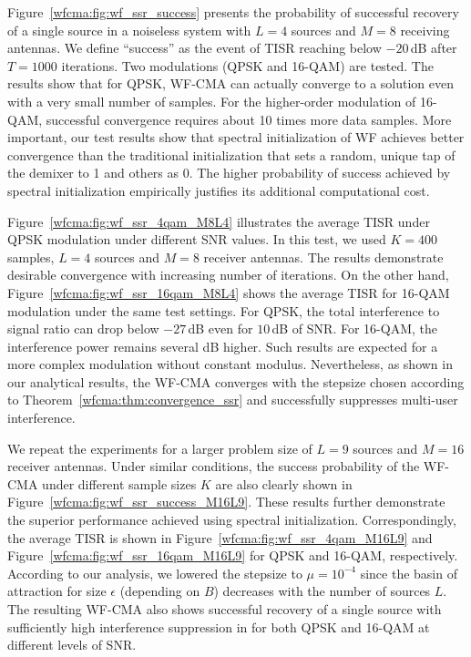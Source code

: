 Figure~\ref{wfcma:fig:wf_ssr_success} presents the probability of successful recovery of a single source in a noiseless system with $L=4$ sources and $M=8$ receiving antennas.
We define ``success'' as the event of TISR reaching below $-20\,$dB after $T=1000$ iterations.
Two modulations (QPSK and 16-QAM) are tested. The results show that for QPSK, WF-CMA can actually converge to a solution even with a very small number of samples. 
For the higher-order modulation of 16-QAM, successful convergence requires about 10 times more data samples. 
More important, our test results show that spectral initialization of WF achieves better convergence than the traditional initialization that sets a random, unique tap of the demixer to 1 and others as 0. 
The higher probability of success achieved by spectral initialization empirically justifies its additional computational cost. 

Figure~\ref{wfcma:fig:wf_ssr_4qam_M8L4} illustrates the average TISR under QPSK modulation
under different SNR values. 
In this test, we used $K=400$ samples, $L=4$ sources and $M=8$ receiver antennas.
The results demonstrate desirable convergence with increasing number of iterations. 
On the other hand, 
Figure~\ref{wfcma:fig:wf_ssr_16qam_M8L4} shows the average TISR for 16-QAM modulation under the same test settings. 
For QPSK, the total interference to signal ratio can drop below $-27\,$dB even for $10\,$dB of SNR. 
For 16-QAM, the interference power remains several dB higher. Such results are expected for a
more complex modulation without constant modulus. Nevertheless, as shown in our analytical results,
the WF-CMA converges with the stepsize chosen according to Theorem~\ref{wfcma:thm:convergence_ssr}
and successfully suppresses multi-user interference. 

We repeat the experiments for a larger problem size of $L=9$ sources and $M=16$ receiver antennas.
Under similar conditions, the success probability of the WF-CMA under different sample sizes $K$ are also clearly shown in Figure~\ref{wfcma:fig:wf_ssr_success_M16L9}. These results further demonstrate the superior performance achieved using spectral initialization.
Correspondingly, the average TISR is shown in Figure~\ref{wfcma:fig:wf_ssr_4qam_M16L9} and Figure~\ref{wfcma:fig:wf_ssr_16qam_M16L9} for QPSK and 16-QAM, respectively. 
According to our analysis, we lowered the stepsize to $\mu=10^{-4}$ since the basin of attraction for size $\epsilon$ (depending on $B$) decreases with the number of sources $L$.
The resulting WF-CMA also shows successful recovery of a single source with sufficiently high interference suppression in for both QPSK and 16-QAM at different levels of SNR. 

